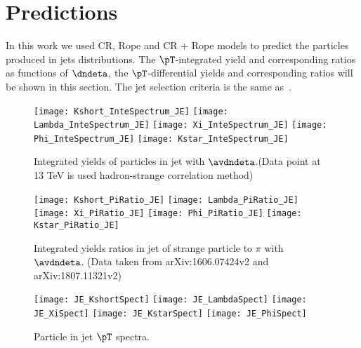 \documentclass[ALICE,manyauthors]{StrinJet}
\begin{document}
\clearpage
\section{Predictions}
\label{sec:predic}
In this work we used CR, Rope and CR + Rope models to predict the particles produced in jets distributions. The $\pT$-integrated yield and corresponding ratios as functions of $\dndeta$, the $\pT$-differential yields and corresponding ratios will be shown in this section. The jet selection criteria is the same as~\cite{ALICE:2021cvd}.
\begin{figure}[ht]
	\begin{center}
		\texttt{[image: Kshort\_InteSpectrum\_JE]}
		\texttt{[image: Lambda\_InteSpectrum\_JE]}
		\texttt{[image: Xi\_InteSpectrum\_JE]}
		\texttt{[image: Phi\_InteSpectrum\_JE]}
		\texttt{[image: Kstar\_InteSpectrum\_JE]}
	\end{center}
	\caption{Integrated yields of particles in jet with $\avdndeta$.(Data point at 13 TeV is used hadron-strange correlation method)}
	\label{fig:JCIntePar}
\end{figure}

\begin{figure}[ht]
	\begin{center}
		\texttt{[image: Kshort\_PiRatio\_JE]}
		\texttt{[image: Lambda\_PiRatio\_JE]}
		\texttt{[image: Xi\_PiRatio\_JE]}
		\texttt{[image: Phi\_PiRatio\_JE]}
		\texttt{[image: Kstar\_PiRatio\_JE]}
	\end{center}
	\caption{Integrated yields ratios in jet of strange particle to $\pi$ with $\avdndeta$. (Data taken from arXiv:1606.07424v2 and arXiv:1807.11321v2)}
	\label{fig:JEIntePartoPiRatio}
\end{figure}


\begin{figure}[ht]
	\begin{center}
		\texttt{[image: JE\_KshortSpect]}
		\texttt{[image: JE\_LambdaSpect]}
		\texttt{[image: JE\_XiSpect]}
		\texttt{[image: JE\_KstarSpect]}
		\texttt{[image: JE\_PhiSpect]}
	\end{center}
	\caption{Particle in jet $\pT$ spectra.}
	\label{fig:JEParSpect}
\end{figure}
\end{document}
